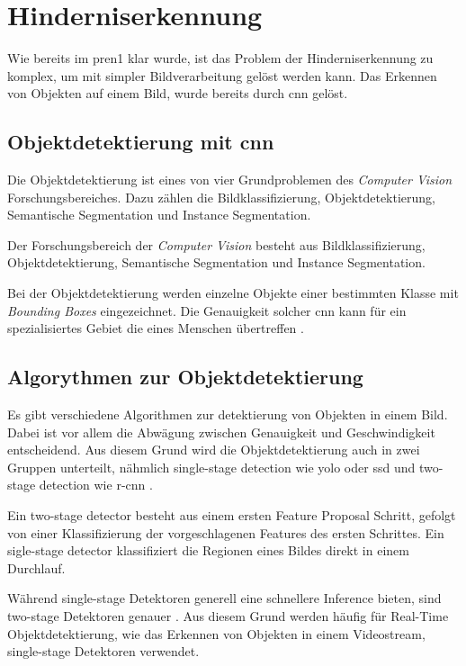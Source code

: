 \section{Hinderniserkennung}

Wie bereits im \acrshort{pren1} klar wurde, ist das Problem der Hinderniserkennung zu komplex,
um mit simpler Bildverarbeitung gelöst werden kann. 
Das Erkennen von Objekten auf einem Bild, wurde bereits durch \acrfull{cnn} gelöst.

\subsection{Objektdetektierung mit \acrshort{cnn}}

Die Objektdetektierung ist eines von vier Grundproblemen des {\it Computer Vision} Forschungsbereiches.
Dazu zählen die Bildklassifizierung, Objektdetektierung, Semantische Segmentation und Instance Segmentation.

{
Der Forschungsbereich der {\it Computer Vision} \cite{wu2019recent} besteht aus Bildklassifizierung, 
Objektdetektierung, Semantische Segmentation und Instance Segmentation.
}

Bei der Objektdetektierung werden einzelne Objekte einer bestimmten Klasse mit {\it Bounding Boxes}
eingezeichnet. Die Genauigkeit solcher \acrshort{cnn} kann für ein spezialisiertes Gebiet die
eines Menschen übertreffen \cite{BUETTIDINH2019e00321}.

\subsection{Algorythmen zur Objektdetektierung}

Es gibt verschiedene Algorithmen zur detektierung von Objekten in einem Bild. 
Dabei ist vor allem die Abwägung zwischen Genauigkeit und Geschwindigkeit entscheidend.
Aus diesem Grund wird die Objektdetektierung auch in zwei Gruppen unterteilt, nähmlich 
single-stage detection wie \acrshort{yolo} \cite{redmon2016look} oder \acrshort{ssd} \cite{Liu_2016} und two-stage detection wie \acrfull{r-cnn} \cite{girshick2015fast}.

Ein two-stage detector besteht aus einem ersten Feature Proposal Schritt, gefolgt von einer Klassifizierung der 
vorgeschlagenen Features des ersten Schrittes. Ein sigle-stage detector klassifiziert die Regionen eines Bildes
direkt in einem Durchlauf. 

Während single-stage Detektoren generell eine schnellere Inference bieten, sind two-stage Detektoren genauer \cite{soviany2018optimizing}.
Aus diesem Grund werden häufig für Real-Time Objektdetektierung, wie das Erkennen von Objekten in einem Videostream, single-stage
Detektoren verwendet.

